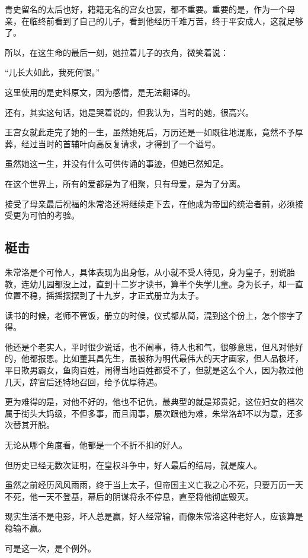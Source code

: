 \begin{multicols}{\theparacolNo}
青史留名的太后也好，籍籍无名的宫女也罢，都不重要。重要的是，作为一个母亲，在临终前看到了自己的儿子，看到他经历千难万苦，终于平安成人，这就足够了。

所以，在这生命的最后一刻，她拉着儿子的衣角，微笑着说：

“儿长大如此，我死何恨。”

这里使用的是史料原文，因为感情，是无法翻译的。

还有，其实这句话，她是哭着说的，但我认为，当时的她，很高兴。

王宫女就此走完了她的一生，虽然她死后，万历还是一如既往地混账，竟然不予厚葬，经过当时的首辅叶向高反复请求，才得到了一个谥号。

虽然她这一生，并没有什么可供传诵的事迹，但她已然知足。

在这个世界上，所有的爱都是为了相聚，只有母爱，是为了分离。

接受了母亲最后祝福的朱常洛还将继续走下去，在他成为帝国的统治者前，必须接受更为可怕的考验。

\subsection{梃击}
朱常洛是个可怜人，具体表现为出身低，从小就不受人待见，身为皇子，别说胎教，连幼儿园都没上过，直到十二岁才读书，算半个失学儿童。身为长子，却一直位置不稳，摇摇摆摆到了十九岁，才正式册立为太子。

读书的时候，老师不管饭，册立的时候，仪式都从简，混到这个份上，怎个惨字了得。

他还是个老实人，平时很少说话，也不闹事，待人也和气，很够意思，但凡对他好的，他都报恩。比如董其昌先生，虽被称为明代最伟大的天才画家，但人品极坏，平日欺男霸女，鱼肉百姓，闹得当地百姓都受不了，但就是这么个人，因为教过他几天，辞官后还特地召回，给予优厚待遇。

更为难得的是，对他不好的，他也不记仇，最典型的就是郑贵妃，这位妇女的档次属于街头大妈级，不但多事，而且闹事，屡次跟他为难，朱常洛却不以为意，还多次替其开脱。

无论从哪个角度看，他都是一个不折不扣的好人。

但历史已经无数次证明，在皇权斗争中，好人最后的结局，就是废人。

虽然之前经历风风雨雨，终于当上太子，但帝国主义亡我之心不死，只要万历一天不死，他一天不登基，幕后的阴谋将永不停息，直至将他彻底毁灭。

现实生活不是电影，坏人总是赢，好人经常输，而像朱常洛这种老好人，应该算是稳输不赢。

可是这一次，是个例外。


\end{multicols}
